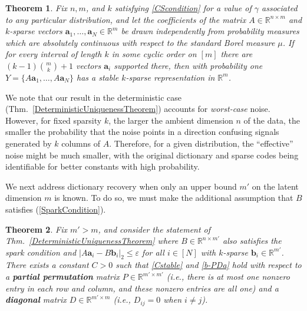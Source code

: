 \documentclass[journal, twocolumn]{IEEEtran}
\newtheorem{theorem}{Theorem}
\begin{document}
\begin{theorem}\label{ProbabilisticTheorem}
Fix $n, m$, and $k$ satisfying \eqref{CScondition} for a value of $\gamma$ associated to any particular distribution, and let the coefficients of the matrix $A \in \mathbb{R}^{n \times m}$ and $k$-sparse vectors $\mathbf{a}_1, \ldots, \mathbf{a}_N \in \mathbb{R}^m$ be drawn independently from probability measures which are absolutely continuous with respect to the standard Borel measure $\mu$. If for every interval of length $k$ in some cyclic order on $[m]$ there are $(k-1){m \choose k} + 1$ vectors $\mathbf{a}_i$ supported there, then with probability one $Y = \{A\mathbf{a}_1, \ldots, A\mathbf{a}_N\}$ has a stable $k$-sparse representation in $\mathbb{R}^m$.
\end{theorem}

We note that our result in the deterministic case (Thm.~\ref{DeterministicUniquenessTheorem}) accounts for \emph{worst-case} noise.  However, for fixed sparsity $k$, the larger the ambient dimension $n$ of the data, the smaller the probability that the noise points in a direction  confusing signals generated by $k$ columns of $A$.  Therefore, for a given distribution, the ``effective'' noise might be much smaller, with the original dictionary and sparse codes being identifiable for better constants with high probability. 

We next address dictionary recovery when only an upper bound $m'$ on the latent dimension $m$ is known. To do so, we must make the additional assumption that $B$ satisfies (\ref{SparkCondition}). 

\begin{theorem}\label{DeterministicUniquenessTheorem2}
Fix $m' > m$, and consider the statement of Thm.~\ref{DeterministicUniquenessTheorem} where $B \in \mathbb{R}^{n \times m'}$ also satisfies the spark condition and \mbox{$|A\mathbf{a}_i - B\mathbf{b}_i|_2 \leq \varepsilon$} for all $i \in [N]$ with $k$-sparse $\mathbf{b}_i \in \mathbb{R}^{m'}$.  There exists a constant $C > 0$ such that \eqref{Cstable} and \eqref{b-PDa} hold with respect to a \textbf{partial permutation} matrix $P \in \mathbb{R}^{m' \times m'}$ (i.e., there is at most one nonzero entry in each row and column, and these nonzero entries are all one) and a \textbf{diagonal} matrix $D \in \mathbb{R}^{m' \times m}$ (i.e., $D_{ij} = 0$ when $i \neq j$). 
\end{theorem}
\end{document}
